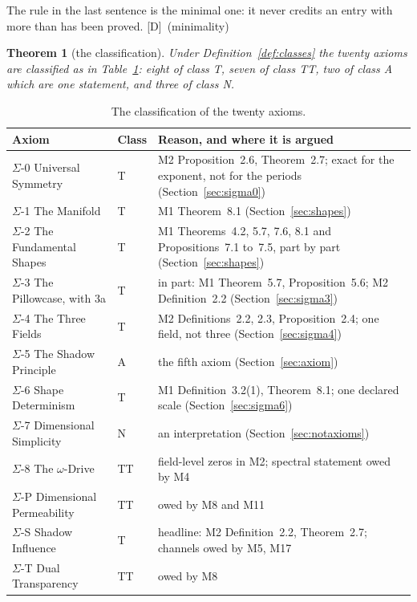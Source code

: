 \documentclass[11pt,a4paper]{article}
\theoremstyle{plain}
\newtheorem{theorem}{Theorem}[section]
\theoremstyle{definition}
\theoremstyle{remark}
\newcommand{\rigD}{[\textup{D}]}
\newcommand{\Sig}[1]{$\Sigma$-#1}
\begin{document}
The rule in the last sentence is the minimal one: it never credits an entry with more than has been proved. \rigD\ (minimality)

\begin{theorem}[the classification]\label{thm:classification}
Under Definition~\ref{def:classes} the twenty axioms are classified as in Table~\ref{tab:classes}: eight of class T, seven of class TT, two of class A which are one statement, and three of class N.
\end{theorem}

\begin{table}[t]
\begin{center}\small
\caption{The classification of the twenty axioms.}\label{tab:classes}
\begin{tabular}{@{}p{}lp{}@{}}
\toprule
Axiom & Class & Reason, and where it is argued \\
\midrule
\Sig{0} Universal Symmetry & T & M2 Proposition~2.6, Theorem~2.7; exact for the exponent, not for the periods (Section~\ref{sec:sigma0}) \\
\Sig{1} The Manifold & T & M1 Theorem~8.1 (Section~\ref{sec:shapes}) \\
\Sig{2} The Fundamental Shapes & T & M1 Theorems~4.2, 5.7, 7.6, 8.1 and Propositions~7.1 to~7.5, part by part (Section~\ref{sec:shapes}) \\
\Sig{3} The Pillowcase, with 3a & T & in part: M1 Theorem~5.7, Proposition~5.6; M2 Definition~2.2 (Section~\ref{sec:sigma3}) \\
\Sig{4} The Three Fields & T & M2 Definitions~2.2, 2.3, Proposition~2.4; one field, not three (Section~\ref{sec:sigma4}) \\
\Sig{5} The Shadow Principle & A & the fifth axiom (Section~\ref{sec:axiom}) \\
\Sig{6} Shape Determinism & T & M1 Definition~3.2(1), Theorem~8.1; one declared scale (Section~\ref{sec:sigma6}) \\
\Sig{7} Dimensional Simplicity & N & an interpretation (Section~\ref{sec:notaxioms}) \\
\Sig{8} The $\omega$-Drive & TT & field-level zeros in M2; spectral statement owed by M4 \\
\Sig{P} Dimensional Permeability & TT & owed by M8 and M11 \\
\Sig{S} Shadow Influence & T & headline: M2 Definition~2.2, Theorem~2.7; channels owed by M5, M17 \\
\Sig{T} Dual Transparency & TT & owed by M8 \\

\end{tabular}
\end{center}
\end{table}
\end{document}
